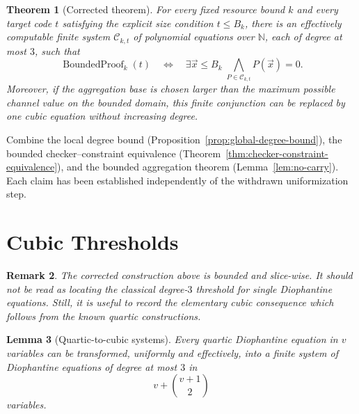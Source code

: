 \documentclass[letterpaper,10pt]{article}
\makeatletter
\theoremstyle{upright}
\theoremstyle{upright}
\newtheorem{theorem}{Theorem}[section]
\newtheorem{remark}[theorem]{Remark}
\newtheorem{lemma}[theorem]{Lemma}
\renewenvironment{proof}[1][Proof]{%
	\par\pushQED{\qed}%
	\normalfont
	\topsep6\p@\@plus6\p@\relax
	\trivlist
	\item[\hskip\labelsep\slshape #1\@addpunct{.}]%
}{%
	\popQED\endtrivlist\@endpefalse
}
\makeatother
\begin{document}
\begin{theorem}[Corrected theorem]
\label{thm:corrected-theorem}
	For every fixed resource bound $k$ and every target code $t$ satisfying the explicit size condition $t\leq B_k$, there is an effectively computable finite system $\mathcal{C}_{k,t}$ of polynomial equations over $\mathbb{N}$, each of degree at most $3$, such that
	\begin{equation}
		\operatorname{BoundedProof}_k(t)
		\quad\Longleftrightarrow\quad
		\exists\vec{x}\leq B_k\;
		\bigwedge_{P\in\mathcal{C}_{k,t}}P(\vec{x})=0.
	\end{equation}
	Moreover, if the aggregation base is chosen larger than the maximum possible channel value on the bounded domain, this finite conjunction can be replaced by one cubic equation without increasing degree.
\end{theorem}

\begin{proof}
	Combine the local degree bound (Proposition~\ref{prop:global-degree-bound}), the bounded checker--constraint equivalence (Theorem~\ref{thm:checker-constraint-equivalence}), and the bounded aggregation theorem (Lemma~\ref{lem:no-carry}). Each claim has been established independently of the withdrawn uniformization step.
\end{proof}

\section{Cubic Thresholds}
\label{sec:hn-threshold}

\begin{remark}
	The corrected construction above is bounded and slice-wise. It should not be read as locating the classical degree-$3$ threshold for single Diophantine equations. Still, it is useful to record the elementary cubic consequence which follows from the known quartic constructions.
\end{remark}

\begin{lemma}[Quartic-to-cubic systems]
\label{lem:quartic-cubic-system-closure}
	Every quartic Diophantine equation in $v$ variables can be transformed, uniformly and effectively, into a finite system of Diophantine equations of degree at most $3$ in
	\begin{equation}
		v+\binom{v+1}{2}
	\end{equation}
	variables.
\end{lemma}
\end{document}
